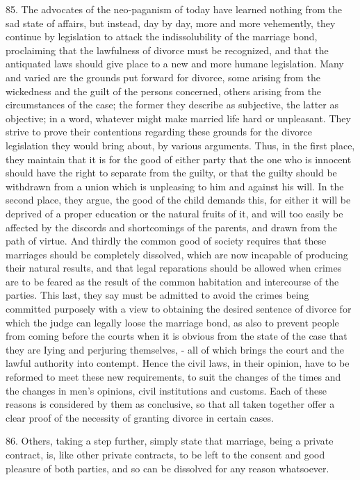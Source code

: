 \documentclass[12pt,a4paper]{book}
\begin{document}
85. The advocates of the neo-paganism of today have learned nothing from the sad state of affairs, but instead, day by day, more and more vehemently, they continue by legislation to attack the indissolubility of the marriage bond, proclaiming that the lawfulness of divorce must be recognized, and that the antiquated laws should give place to a new and more humane legislation. Many and varied are the grounds put forward for divorce, some arising from the wickedness and the guilt of the persons concerned, others arising from the circumstances of the case; the former they describe as subjective, the latter as objective; in a word, whatever might make married life hard or unpleasant. They strive to prove their contentions regarding these grounds for the divorce legislation they would bring about, by various arguments. Thus, in the first place, they maintain that it is for the good of either party that the one who is innocent should have the right to separate from the guilty, or that the guilty should be withdrawn from a union which is unpleasing to him and against his will. In the second place, they argue, the good of the child demands this, for either it will be deprived of a proper education or the natural fruits of it, and will too easily be affected by the discords and shortcomings of the parents, and drawn from the path of virtue. And thirdly the common good of society requires that these marriages should be completely dissolved, which are now incapable of producing their natural results, and that legal reparations should be allowed when crimes are to be feared as the result of the common habitation and intercourse of the parties. This last, they say must be admitted to avoid the crimes being committed purposely with a view to obtaining the desired sentence of divorce for which the judge can legally loose the marriage bond, as also to prevent people from coming before the courts when it is obvious from the state of the case that they are Iying and perjuring themselves, - all of which brings the court and the lawful authority into contempt. Hence the civil laws, in their opinion, have to be reformed to meet these new requirements, to suit the changes of the times and the changes in men's opinions, civil institutions and customs. Each of these reasons is considered by them as conclusive, so that all taken together offer a clear proof of the necessity of granting divorce in certain cases.

86. Others, taking a step further, simply state that marriage, being a private contract, is, like other private contracts, to be left to the consent and good pleasure of both parties, and so can be dissolved for any reason whatsoever.
\end{document}
